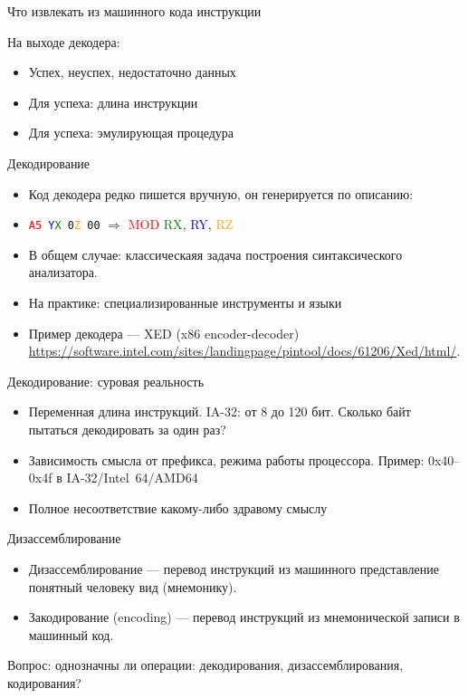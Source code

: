 \begin{frame}{Что извлекать из машинного кода инструкции}
\begin{centering}
\end{centering}

На выходе декодера:
\begin{itemize}
\item Успех, неуспех, недостаточно данных
\item Для успеха: длина инструкции
\item Для успеха: эмулирующая процедура
\end{itemize}
\end{frame}

\begin{frame}{Декодирование}
\begin{itemize}
\item Код декодера редко пишется вручную, он генерируется по описанию:
\item \texttt{\textcolor{red}{A5} \textcolor{blue}{Y}\textcolor{green}{X} 0\textcolor{orange}{Z} 00} $\Rightarrow$ \textcolor{red}{MOD} \textcolor{green}{RX}, \textcolor{blue}{RY}, \textcolor{orange}{RZ}
\item В общем случае: классическаяя задача построения синтаксического анализатора.
\item На практике: специализированные инструменты и языки
\item Пример декодера --- XED (x86 encoder-decoder) \url{https://software.intel.com/sites/landingpage/pintool/docs/61206/Xed/html/}.
\end{itemize}
\end{frame}

\begin{frame}{Декодирование: суровая реальность}
\begin{itemize}
\item Переменная длина инструкций. IA-32: от 8 до 120 бит. Сколько байт пытаться декодировать за один раз?
\item Зависимость смысла от префикса, режима работы процессора. Пример: 0x40–0x4f в IA-32/Intel~64/AMD64
\item Полное несоответствие какому-либо здравому смыслу
\end{itemize}
\end{frame}

\begin{frame}{Дизассемблирование}
\begin{itemize}
\item Дизассемблирование --- перевод инструкций из машинного представление понятный
человеку вид (мнемонику).
\item Закодирование (encoding) --- перевод инструкций из мнемонической записи в
машинный код.
\end{itemize}
\pause
Вопрос: однозначны ли операции: декодирования, дизассемблирования, кодирования?
\end{frame}

